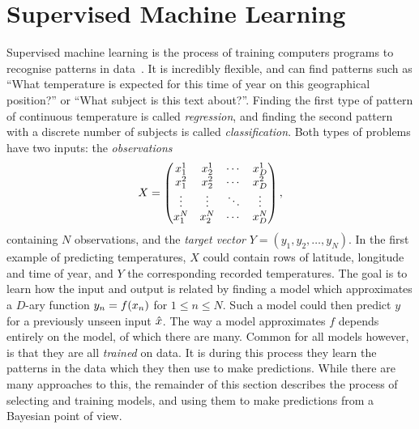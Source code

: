 \section{Supervised Machine Learning}
Supervised machine learning is the process of training computers programs to
recognise patterns in data~\cite{Bishop-2006}. It is incredibly
flexible, and can find patterns such as ``What
temperature is expected for this time of year on this geographical
position?'' or ``What subject is this text about?''. Finding the first
type of pattern of continuous temperature is called
\textit{regression}, and finding the
second pattern with a discrete number of subjects is called
\textit{classification}. Both types of problems have two inputs: 
the \textit{observations}
\[X =
  \begin{pmatrix}
    x_{1}^{1} & x_{2}^{1} & \cdots & x_{D}^{1} \\
    x_{1}^{2} & x_{2}^{2} & \cdots & x_{D}^{2} \\
    \vdots  & \vdots  & \ddots & \vdots  \\
    x_{1}^{N} & x_{2}^{N} & \cdots & x_{D}^{N} \\
  \end{pmatrix},
\]
containing $N$ observations, and the \textit{target vector} $Y = (y_{1},
y_{2}, \dots, y_{N})$. In the first example of predicting temperatures,
$X$ could contain rows of latitude, longitude and time of year, and $Y$ the
corresponding recorded temperatures. The
goal is to learn how the input and output is related by finding a model which approximates a $D$-ary function $y_n =
f(x_n)$ for $1 \leq n \leq N$. Such a model could then
predict $y$ for a previously unseen input $\hat{x}$. The way a
model approximates $f$ depends entirely on the model, of which there
are many. Common for all models however, is that they are all \textit{trained}
on data. It is during this process they learn the patterns in the data
which they then use to make predictions.
While there are many approaches to this, the remainder of this
section describes the process of selecting and training models,
and using them to make predictions from a Bayesian point of view.

